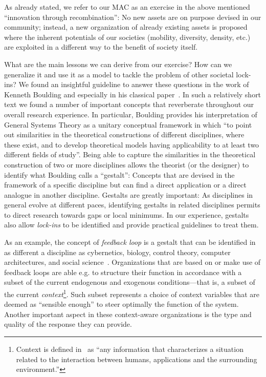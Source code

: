 \documentclass{llncs}
\begin{document}
As already stated, 
we refer to our MAC as an exercise in the above mentioned ``innovation through recombination'': No new
assets are on purpose devised in our community; instead, a new organization of already existing assets is
proposed where the inherent potentials of our societies (mobility, diversity, density, etc.) are
exploited in a different way to the benefit of society itself.

What are the main lessons we can derive from our exercise? How can we generalize it and use it as a
model to tackle the problem of other societal lock-ins? We found an insightful guideline to answer these
questions in the work of Kenneth Boulding and especially in his classical paper~\cite{Bou56}. In such a
relatively short text we found a number of important concepts that reverberate throughout our overall
research experience. In particular, Boulding provides his interpretation of General Systems Theory as a
unitary conceptual framework in which ``to point out similarities in the theoretical constructions of
different disciplines, where these exist, and to develop theoretical models having applicability to at
least two different fields of study''. Being able to capture the similarities in the theoretical
construction of two or more disciplines allows the theorist (or the designer) to identify what Boulding
calls a ``gestalt'': Concepts that are devised in the framework of a specific discipline but can find a
direct application or a direct analogue in another discipline. Gestalts are greatly important: As
disciplines in general evolve at different paces, identifying gestalts in related disciplines permits to
direct research towards gaps or local minimums. In our experience, gestalts also allow \emph{lock-ins\/}
to be identified and provide practical guidelines to treat them.

As an example, the concept of \emph{feedback loop\/} is a gestalt that can be identified in as different a
discipline as cybernetics, biology, control theory, computer architectures, and social
science~\cite{PVR07}. Organizations that are based on or make use of feedback loops are able e.g. to
structure their function in accordance with a subset of the current endogenous and exogenous
conditions---that is, a subset of the current 
\emph{context}\footnote{Context is defined in~\cite{Dey01} as 
               ``any information that
                 characterizes a situation related to the interaction between
		 humans, applications and the surrounding
                 environment.''}.
Such subset represents a choice of context variables that are deemed as ``sensible enough'' to steer
optimally the function of the system. Another important aspect in these context-aware organizations is
the type and quality of the response they can provide.
\end{document}
